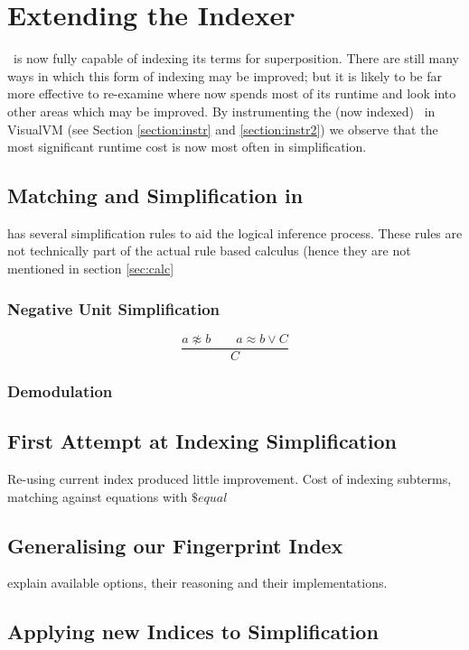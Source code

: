 \section{Extending the Indexer}

\Beagle\ is now fully capable of indexing its terms for superposition. There
are still many ways in which this form of indexing may be improved; but it is likely
to be far more effective to re-examine where \beagle now spends most of its runtime
and look into other areas which may be improved. By instrumenting the (now indexed)
\beagle\ in VisualVM (see Section \ref{section:instr} and \ref{section:instr2})
we observe that the most significant runtime cost is now most often in simplification.

\subsection{Matching and Simplification in \Beagle}
\Beagle has several simplification rules to aid the logical inference process.
These rules are not technically part of the actual rule based calculus
(hence they are not mentioned in section \ref{sec:calc}

\subsubsection{Negative Unit Simplification}

\[ \frac{a\not\approx b \quad \quad a \approx b  \lor C}{C} \]

\subsubsection{Demodulation}


\subsection{First Attempt at Indexing Simplification}
Re-using current index produced little improvement. Cost of indexing
subterms, matching against equations with $\$equal$

\subsection{Generalising our Fingerprint Index}

explain available options, their reasoning and their implementations.

\subsection{Applying new Indices to Simplification}



